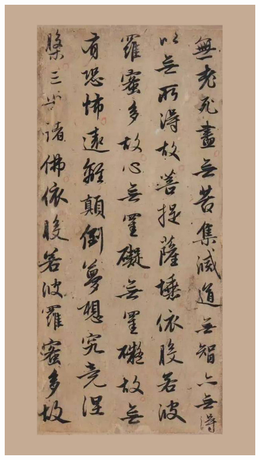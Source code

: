 \documentclass[a4paper,twoside]{article}
\begin{document}
\begin{figure}[ht]
\centering
\includegraphics[width=13.2cm]{images/zhaomengfu-3}
\end{figure}
\end{document}
